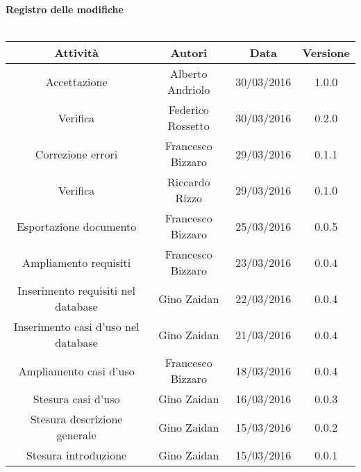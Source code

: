 \vspace{1cm}
   {\fontsize{15pt}{16pt}\selectfont \textbf{Registro delle modifiche}}\\ \\

\bgroup
\def\arraystretch{1.6}
\begin{tabular}{| c | c | c | c |}
\hline
\textbf{Attività} & \textbf{Autori} & \textbf{Data} & \textbf{Versione}\\ \hline \hline


Accettazione  & Alberto Andriolo & 30/03/2016 & 1.0.0 \\ \hline

Verifica & Federico Rossetto & 30/03/2016 & 0.2.0 \\ \hline

Correzione errori & Francesco Bizzaro & 29/03/2016 & 0.1.1 \\ \hline  

Verifica & Riccardo Rizzo & 29/03/2016 & 0.1.0 \\ \hline  

Esportazione documento & Francesco Bizzaro & 25/03/2016 & 0.0.5 \\ \hline 

Ampliamento requisiti & Francesco Bizzaro & 23/03/2016 & 0.0.4 \\ \hline 

Inserimento requisiti nel database & Gino Zaidan & 22/03/2016 & 0.0.4 \\ \hline 

Inserimento casi d'uso nel database & Gino Zaidan & 21/03/2016 & 0.0.4 \\ \hline 

Ampliamento casi d'uso & Francesco Bizzaro & 18/03/2016 & 0.0.4 \\ \hline

Stesura casi d'uso & Gino Zaidan & 16/03/2016 & 0.0.3 \\ \hline

Stesura descrizione generale & Gino Zaidan & 15/03/2016 & 0.0.2 \\ \hline 

Stesura introduzione & Gino Zaidan & 15/03/2016 & 0.0.1 \\ \hline 


\end{tabular}
\egroup
\newpage